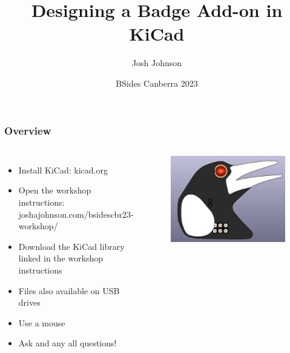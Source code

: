 \documentclass[aspectratio=169, t]{beamer}
\title[Designing a Badge Add-on in KiCad]{Designing a Badge Add-on in KiCad}
\author{Josh Johnson}
\date{BSides Canberra 2023}
\begin{document}
\begin{frame}
\titlepage
\end{frame}

\begin{frame}
\frametitle{Overview}
\begin{columns}
		\begin{itemize}
			\item Install KiCad: kicad.org
			\item Open the workshop instructions: joshajohnson.com/bsidescbr23-workshop/
			\item Download the KiCad library linked in the workshop instructions
			\item Files also available on USB drives
			\item Use a mouse
			\item Ask and any all questions!
		\end{itemize}
	
		\begin{figure}
			\includegraphics[width=1.0\linewidth]{images/magpie_render.png}
		\end{figure}
\end{columns}
\end{frame}
\end{document}
